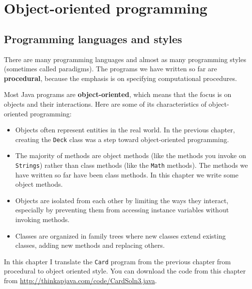 \documentclass[12pt]{book}
\theoremstyle{definition}
\begin{document}
\chapter{Object-oriented programming}
\label{chap13}

\section{Programming languages and styles}

There are many programming languages and almost as many
programming styles (sometimes called paradigms).  
The programs we have written so far are {\bf procedural}, 
because the emphasis is on specifying computational procedures.

Most Java programs are {\bf object-oriented}, which means that
the focus is on objects and their interactions.
Here are some of its characteristics of object-oriented programming:

\begin{itemize}

\item Objects often represent entities in the real world.
  In the previous chapter, creating the {\tt Deck} class
  was a step toward object-oriented programming.

\item The majority of methods are object methods (like the methods you
  invoke on {\tt Strings}) rather than class methods (like the {\tt Math}
  methods).  The methods we have written so far have
  been class methods.  In this chapter we write some object methods.

\item Objects are isolated from each other by limiting the ways they
  interact, especially by preventing them from accessing
  instance variables without invoking methods.

\item Classes are organized in family trees where
  new classes extend existing classes, adding new methods and
  replacing others.

\end{itemize}

In this chapter I translate the {\tt Card} program from the
previous chapter from procedural to object oriented style.  You
can download the code from this chapter from
\url{http://thinkapjava.com/code/CardSoln3.java}.
\end{document}
